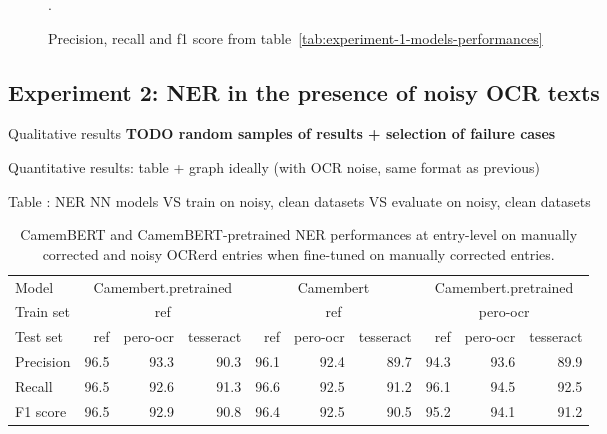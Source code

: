 \begin{figure}[h!]
	  \caption{\label{fig:f1-vs-trainsize} Precision, recall and f1 score from table~\ref{tab:experiment-1-models-performances}}.
\end{figure}
	                                        


\subsection{Experiment 2: NER in the presence of noisy OCR texts}

Qualitative results
\textbf{TODO random samples of results + selection of failure cases}

Quantitative results: table + graph ideally (with OCR noise, same format as previous)

Table : NER NN models VS train on {noisy, clean} datasets VS evaluate on {noisy, clean} datasets

\begin{table}
\caption{CamemBERT and CamemBERT-pretrained NER performances at entry-level on manually corrected and noisy OCRerd entries when fine-tuned on manually corrected entries.}
\begin{tabular}{lrrrrrrrrr}
Model & \multicolumn{3}{c}{Camembert.pretrained} & \multicolumn{3}{c}{Camembert} & \multicolumn{3}{c}{Camembert.pretrained} \\
Train set & \multicolumn{3}{c}{ref} & \multicolumn{3}{c}{ref} & \multicolumn{3}{c}{pero-ocr} \\
Test set &                  ref & pero-ocr & tesseract &       ref & pero-ocr & tesseract &                  ref & pero-ocr & tesseract \\
\midrule
Precision &                 96.5 &     93.3 &      90.3 &      96.1 &     92.4 &      89.7 &                 94.3 &     93.6 &      89.9 \\
Recall    &                 96.5 &     92.6 &      91.3 &      96.6 &     92.5 &      91.2 &                 96.1 &     94.5 &      92.5 \\
F1 score        &                 96.5 &     92.9 &      90.8 &      96.4 &     92.5 &      90.5 &                 95.2 &     94.1 &      91.2 \\
\end{tabular}
\end{table}


